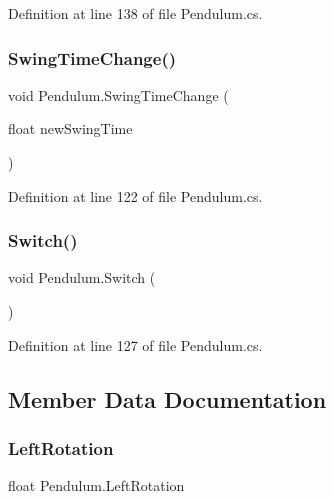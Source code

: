 Definition at line 138 of file Pendulum.\+cs.

\mbox{\label{class_pendulum_a92ffc3bfaffb36119d44ec1e294e7f94}} 
\subsubsection{\texorpdfstring{Swing\+Time\+Change()}{SwingTimeChange()}}
{\footnotesize\ttfamily void Pendulum.\+Swing\+Time\+Change (\begin{DoxyParamCaption}\item[{float}]{new\+Swing\+Time }\end{DoxyParamCaption})}



Definition at line 122 of file Pendulum.\+cs.

\mbox{\label{class_pendulum_a17768e1c761cd5cd094e75b1e70f3147}} 
\subsubsection{\texorpdfstring{Switch()}{Switch()}}
{\footnotesize\ttfamily void Pendulum.\+Switch (\begin{DoxyParamCaption}{ }\end{DoxyParamCaption})}



Definition at line 127 of file Pendulum.\+cs.



\subsection{Member Data Documentation}
\mbox{\label{class_pendulum_a9dea0e58df8856dbc4d07230bf9c17b6}} 
\subsubsection{\texorpdfstring{Left\+Rotation}{LeftRotation}}
{\footnotesize\ttfamily float Pendulum.\+Left\+Rotation}




